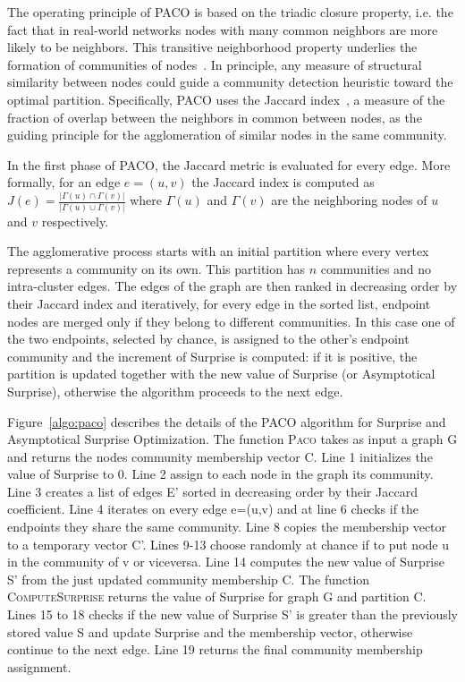 The operating principle of PACO is based on the triadic closure property, i.e. the fact that in real-world networks nodes with many common neighbors are more likely to be neighbors.
This transitive neighborhood property underlies the formation of communities of nodes~\cite{bianconi2014,eustace2015}.
In principle, any measure of structural similarity between nodes could guide a community detection heuristic toward the optimal partition.
Specifically, PACO uses the Jaccard index~\cite{jaccard1901}, a measure of the fraction of overlap between the neighbors in common between nodes, as the guiding principle for the agglomeration of similar nodes in the same community.

In the first phase of PACO, the Jaccard metric is evaluated for every edge. More formally, for an edge $e=(u,v)$ the Jaccard index is computed as $J(e)=\frac{|\Gamma(u) \cap \Gamma(v)|}{|\Gamma(u) \cup \Gamma(v)|}$ where $\Gamma(u)$ and $\Gamma(v)$ are the neighboring nodes of $u$ and $v$ respectively.

The agglomerative process starts with an initial partition where every vertex represents a community on its own.
This partition has $n$ communities and no intra-cluster edges.
The edges of the graph are then ranked in decreasing order by their Jaccard index and iteratively, for every edge in the sorted list, endpoint nodes are merged only if they belong to different communities.
In this case one of the two endpoints, selected by chance, is assigned to the other's endpoint community and the increment of Surprise is computed: if it is positive, the partition is updated together with the new value of Surprise (or Asymptotical Surprise), otherwise the algorithm proceeds to the next edge. 

Figure~\ref{algo:paco} describes the details of the PACO algorithm for Surprise and Asymptotical Surprise Optimization.
The function \textsc{Paco} takes as input a graph G and returns the nodes community membership vector C. Line 1 initializes the value of Surprise to 0. Line 2 assign to each node in the graph its community. Line 3 creates a list of edges E' sorted in decreasing order by their Jaccard coefficient. Line 4 iterates on every edge e=(u,v) and at line 6 checks if the endpoints they share the same community. Line 8 copies the membership vector to a temporary vector C'. Lines 9-13 choose randomly at chance if to put node u in the community of v or viceversa. Line 14 computes the new value of Surprise S' from the just updated community membership C. The function \textsc{ComputeSurprise} returns the value of Surprise for graph G and partition C. Lines 15 to 18 checks if the new value of Surprise S' is greater than the previously stored value S and update Surprise and the membership vector, otherwise continue to the next edge. Line 19 returns the final community membership assignment.

